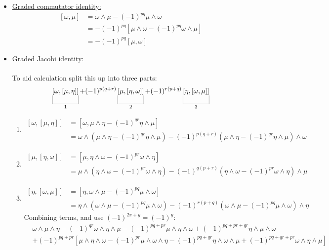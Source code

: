\documentclass[10pt]{article}
\begin{document}
\begin{itemize}
	\item \underline{Graded commutator identity:}
	$$ 
	\begin{aligned}
		[\omega,\mu] &= \omega \wedge \mu - (-1)^{pq} \mu \wedge \omega\\
		&= -(-1)^{pq} [\mu \wedge \omega - (-1)^{pq} \omega \wedge \mu]\\
		&= -(-1)^{pq} [\mu, \omega]
	\end{aligned}
	$$

	\item \underline{Graded Jacobi identity:}\\\\
	To aid calculation split this up into three parts:
	$$
		\ub{[\omega,[\mu,\eta]]}{1}+(-1)^{p(q+r)}\ub{[\mu,[\eta,\omega]]}{2}+(-1)^{r(p+q)}\ub{[\eta,[\omega,\mu]]}{3}
	$$
	\begin{enumerate}
		\item $$
		\begin{aligned}
			[\omega,[\mu,\eta]] &= [\omega, \mu \wedge \eta - (-1)^{qr} \eta \wedge \mu]\\
			&= \omega \wedge (\mu \wedge \eta - (-1)^{qr} \eta \wedge \mu) - (-1)^{p(q+r)} (\mu \wedge \eta - (-1)^{qr} \eta \wedge \mu) \wedge \omega
		\end{aligned} 
		$$
		\item $$
		\begin{aligned}
			[\mu,[\eta,\omega]] &= [\mu, \eta \wedge \omega - (-1)^{pr} \omega \wedge \eta]\\
			&= \mu \wedge (\eta \wedge \omega - (-1)^{pr} \omega \wedge \eta) - (-1)^{q(p+r)} (\eta \wedge \omega - (-1)^{pr} \omega \wedge \eta) \wedge \mu
		\end{aligned} 
		$$
		\item $$
		\begin{aligned}
			[\eta,[\omega,\mu]] &= [\eta, \omega \wedge \mu - (-1)^{pq} \mu \wedge \omega]\\
			&= \eta \wedge (\omega \wedge \mu - (-1)^{pq} \mu \wedge \omega) - (-1)^{r(p+q)} (\omega \wedge \mu - (-1)^{pq} \mu \wedge \omega) \wedge \eta
		\end{aligned} 
		$$
		Combining terms, and use $(-1)^{2x+y}=(-1)^y$:
		$$
		\begin{aligned}
			&\omega \wedge \mu \wedge \eta - (-1)^{qr} \omega \wedge \eta \wedge \mu - (-1)^{pq+pr} \mu \wedge \eta \wedge \omega + (-1)^{pq+pr+qr} \eta \wedge \mu \wedge \omega\\
			&+(-1)^{pq+pr}[\mu \wedge \eta \wedge \omega - (-1)^{pr} \mu \wedge \omega \wedge \eta - (-1)^{pq+qr} \eta \wedge \omega \wedge \mu + (-1)^{pq+qr+pr} \omega \wedge \eta \wedge \mu]\\

\end{aligned}$$
\end{enumerate}
\end{itemize}
\end{document}
